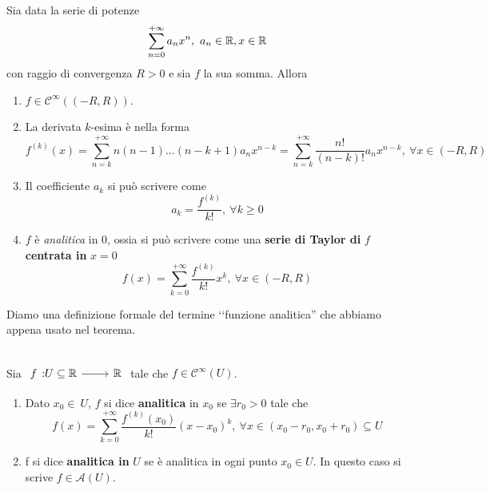 \begin{theorema}~{}\\
	Sia data la serie di potenze
	\begin{equation*}
		\sum_{n=0}^{+\infty}a_nx^n,\ a_n\in\mathbb{R}, x\in\mathbb{R}
	\end{equation*}
con raggio di convergenza $R>0$ e sia $f$ la sua somma. Allora
\begin{enumerate}
	\item $f\in\mathcal{C}^{\infty}\left(\left(-R,R\right)\right)$.
	\item La derivata $k$-esima è nella forma
	\begin{equation}
		f^{\left(k\right)}\left(x\right)=\sum_{n=k}^{+\infty}n\left(n-1\right)\ldots\left(n-k+1\right)a_nx^{n-k}=\sum_{n=k}^{+\infty}\frac{n!}{\left(n-k\right)!}a_nx^{n-k},\ \forall x\in\left(-R,R\right)
	\end{equation}
	\item Il coefficiente $a_k$ si può scrivere come
	\begin{equation}
		a_k=\frac{f^{\left(k\right)}}{k!},\ \forall k\geq 0
	\end{equation}
	\item $f$ è \textit{analitica} in $0$, ossia si può scrivere come una \textbf{serie di Taylor di }$f$\textbf{centrata in }$x=0$
	\begin{equation}
		f\left(x\right)=\sum_{k=0}^{+\infty}\frac{f^{\left(k\right)}}{k!}x^k,\ \forall x\in\left(-R,R\right)
	\end{equation}
\end{enumerate}
\end{theorema}
Diamo una definizione formale del termine ‘‘funzione analitica'' che abbiamo appena usato nel teorema.
\begin{define}~{}\\
	Sia $\funz{f}{U\subseteq \realset}{\realset}$ tale che $f\in\mathcal{C}^{\infty}\left(U\right)$.
	\begin{enumerate}
		\item Dato $x_0\in\ U$, $f$ si dice \textbf{analitica} in $x_0$ se $\exists r_0>0$ tale che
		\begin{equation*}
			f\left(x\right)=\sum_{k=0}^{+\infty}\frac{f^{\left(k\right)}\left(x_0\right)}{k!}\left(x-x_0\right)^k,\ \forall x\in\left(x_0-r_0,x_0+r_0\right)\subseteq U
		\end{equation*}
		\item f si dice \textbf{analitica in }$U$ se è analitica in ogni punto $x_0\in U$. In questo caso si scrive $f\in\mathcal{A}\left(U\right)$.
	\end{enumerate}
\end{define}
